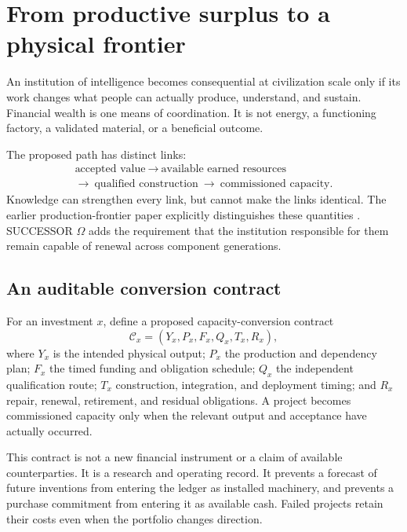 \section{From productive surplus to a physical frontier}
\label{sec:physical}
An institution of intelligence becomes consequential at civilization scale only if its work changes what people can actually produce, understand, and sustain. Financial wealth is one means of coordination. It is not energy, a functioning factory, a validated material, or a beneficial outcome.

The proposed path has distinct links:
\begin{equation*}
\begin{gathered}
\text{accepted value}\ \longrightarrow\ \text{available earned resources}\\[3pt]
\longrightarrow\ \text{qualified construction}\ \longrightarrow\ \text{commissioned capacity}.
\end{gathered}
\end{equation*}
Knowledge can strengthen every link, but cannot make the links identical. The earlier production-frontier paper explicitly distinguishes these quantities \citep{boucherFrontier}. SUCCESSOR $\Omega$ adds the requirement that the institution responsible for them remain capable of renewal across component generations.

\subsection{An auditable conversion contract}
For an investment $x$, define a proposed capacity-conversion contract
\begin{equation}
 \mathcal C_x=(Y_x,P_x,F_x,Q_x,T_x,R_x),
\end{equation}
where $Y_x$ is the intended physical output; $P_x$ the production and dependency plan; $F_x$ the timed funding and obligation schedule; $Q_x$ the independent qualification route; $T_x$ construction, integration, and deployment timing; and $R_x$ repair, renewal, retirement, and residual obligations. A project becomes commissioned capacity only when the relevant output and acceptance have actually occurred.

This contract is not a new financial instrument or a claim of available counterparties. It is a research and operating record. It prevents a forecast of future inventions from entering the ledger as installed machinery, and prevents a purchase commitment from entering it as available cash. Failed projects retain their costs even when the portfolio changes direction.

